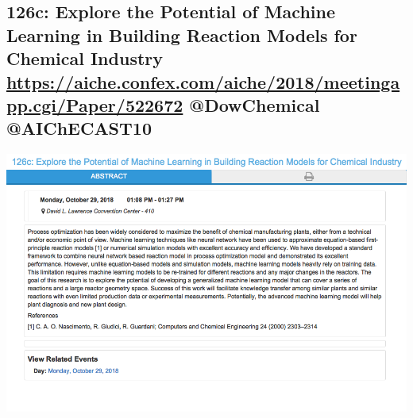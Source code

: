 \documentclass[11pt]{article}
\begin{document}
\subsection{126c: Explore the Potential of Machine Learning in Building Reaction Models for Chemical Industry \url{https://aiche.confex.com/aiche/2018/meetingapp.cgi/Paper/522672}  @DowChemical @AIChECAST10}
\label{sec:orge76bb3b}
\begin{center}
\includegraphics[width=.9\linewidth]{./522672.png}
\end{center}
\end{document}
